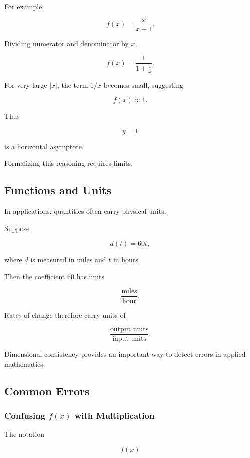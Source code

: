 For example,

\[ f(x)=\frac{x}{x+1}. \]

Dividing numerator and denominator by \(x\),

\[ f(x)=\frac{1}{1+\frac1x}. \]

For very large \(|x|\), the term \(1/x\) becomes small, suggesting

\[ f(x)\approx1. \]

Thus

\[ y=1 \]

is a horizontal asymptote.

Formalizing this reasoning requires limits.

\subsection{Functions and Units}
\label{subsec:functions-units}

In applications, quantities often carry physical units.

Suppose

\[ d(t)=60t, \]

where \(d\) is measured in miles and \(t\) in hours.

Then the coefficient \(60\) has units

\[ \frac{\text{miles}}{\text{hour}}. \]

Rates of change therefore carry units of

\[ \frac{\text{output units}}{\text{input units}}. \]

Dimensional consistency provides an important way to detect errors in
applied mathematics.

\subsection{Common Errors}
\label{subsec:precalculus-common-errors}

\subsubsection{Confusing \(f(x)\) with Multiplication}

The notation

\[ f(x) \]

